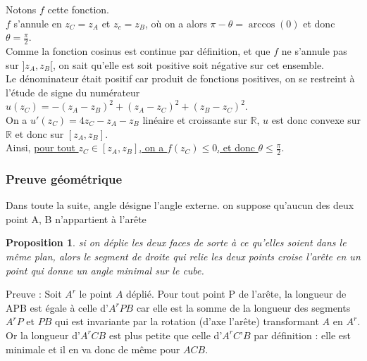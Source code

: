\documentclass{article}
\newtheorem{prop}{Proposition}
\begin{document}
Notons $f$ cette fonction.\\
$f$ s'annule en $z_C = z_A$ et $z_c = z_B$, où on a alors $\pi - \theta = \arccos(0)$ et donc $\theta = \frac{\pi}{2}$.\\
Comme la fonction cosinus est continue par définition, et que $f$ ne s'annule pas sur $]z_A, z_B[$, on sait qu'elle est soit positive soit négative sur cet ensemble.\\
Le dénominateur était positif car produit de fonctions positives, on se restreint à l'étude de signe du numérateur $u(z_C) = -(z_A - z_B)^2 + (z_A - z_C)^2 + (z_B- z_C)^2$.\\
On a $u'(z_C) = 4z_C - z_A - z_B$ linéaire et croissante sur $\mathbb{R}$, $u$ est donc convexe sur $\mathbb{R}$ et donc sur $[z_A, z_B]$.\\
Ainsi, \underline{pour tout $z_C \in [z_A, z_B]$, on a $f(z_C) \leq 0$, et donc $\theta \leq \frac{\pi}{2}$}.




\subsubsection{Preuve géométrique}

Dans toute la suite, angle désigne l’angle externe. on suppose qu'aucun des deux point A, B n'appartient à l'arête

\begin{prop}
si on déplie les deux faces de sorte à ce qu’elles soient dans le même plan, alors le segment de droite qui relie les deux points croise l’arête en un point qui donne un angle minimal sur le cube.
\end{prop}
Preuve : 
Soit $A^r$ le point $A$ déplié. Pour tout point P de l’arête, la longueur de APB est égale à celle d’$A^rPB$ car elle est la somme de la longueur des segments $A^rP$ et $PB$ qui est invariante par la rotation (d’axe l’arête) transformant $A$ en $A^r$. Or la longueur d’$A^rCB$ est plus petite que celle d’$A^rC’B$ par définition : elle est minimale et il en va donc de même pour $ACB.$
\end{document}
